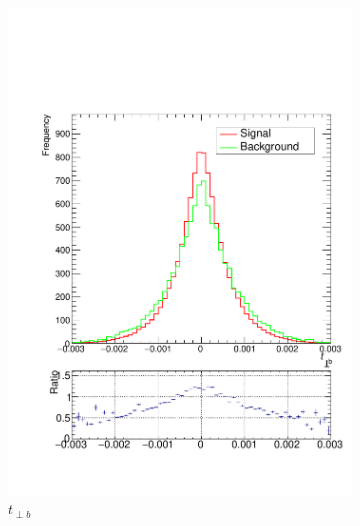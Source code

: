 \documentclass[10pt,a4paper]{book}
\begin{document}
\begin{figure}
\begin{subfigure}{0.33\textwidth}
\includegraphics[scale=0.25]{truth/tper2}
\caption{$t_{\perp b}$}
\end{subfigure}
\begin{subfigure}{.33\textwidth}
\centering

\end{subfigure}
\end{figure}
\end{document}
